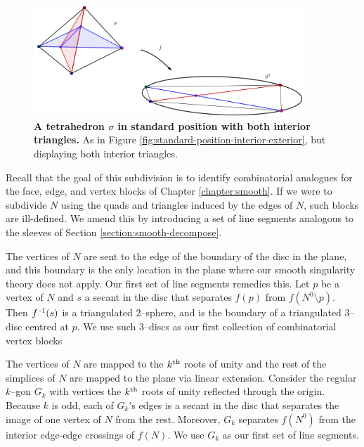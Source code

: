\begin{figure}[h!]
	\centering
	\includegraphics[width=0.9\textwidth]{figures/standard-position-interior-interior.png}
	\caption{
		\textbf{A tetrahedron $\sigma$ in standard position with both interior triangles.}
		As in Figure \ref{fig:standard-position-interior-exterior}, but displaying both interior triangles.
	}
	\label{fig:standard-position-interior-interior}
\end{figure}

Recall that the goal of this subdivision is to identify combinatorial analogues for the face, edge, and vertex blocks of Chapter \ref{chapter:smooth}.
If we were to subdivide $N$ using the quads and triangles induced by the edges of $N$, such blocks are ill-defined.
We amend this by introducing a set of line segments analogous to the sleeves of Section \ref{section:smooth-decompose}.

The vertices of $N$ are sent to the edge of the boundary of the disc in the plane, and this boundary is the only location in the plane where our smooth singularity theory does not apply.
Our first set of line segments remedies this.
Let $p$ be a vertex of $N$ and $s$ a secant in the disc that separates $f(p)$ from $f(N^0\setminus{p})$.
Then $f^{\,\text{-}1}(s)$ is a triangulated 2--sphere, and is the boundary of a triangulated 3--disc centred at $p$.
We use such 3--discs as our first collection of combinatorial vertex blocks

The vertices of $N$ are mapped to the $k^{\text{th}}$ roots of unity and the rest of the simplices of $N$ are mapped to the plane via linear extension.
Consider the regular $k$--gon $G_k$ with vertices the $k^{\text{th}}$ roots of unity reflected through the origin.
Because $k$ is odd, each of $G_k$'s edges is a secant in the disc that separates the image of one vertex of $N$ from the rest.
Moreover, $G_k$ separates $f(N^0)$ from the interior edge-edge crossings of $f(N)$.
We use $G_k$ as our first set of line segments.

